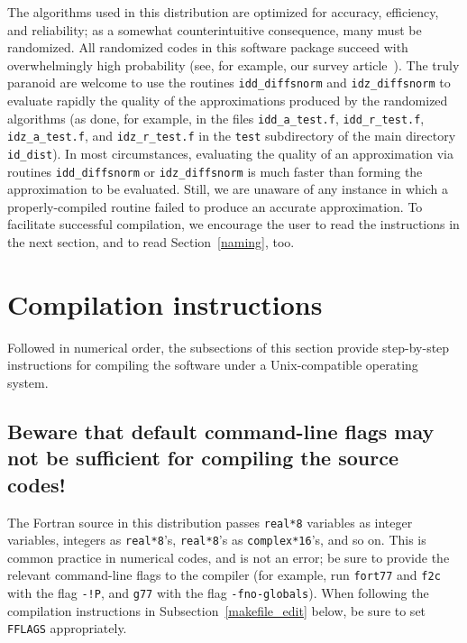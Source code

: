 \documentclass[letterpaper,12pt]{article}
\begin{document}
The algorithms used in this distribution are optimized for accuracy,
efficiency, and reliability; as a somewhat counterintuitive consequence,
many must be randomized. All randomized codes in this software package
succeed with overwhelmingly high probability (see, for example,
our survey article~\cite{liberty-woolfe-martinsson-rokhlin-tygert}).
The truly paranoid are welcome to use the routines {\tt idd\_diffsnorm}
and {\tt idz\_diffsnorm} to evaluate rapidly the quality of the approximations
produced by the randomized algorithms (as done, for example, in the files
{\tt idd\_a\_test.f}, {\tt idd\_r\_test.f}, {\tt idz\_a\_test.f},
and {\tt idz\_r\_test.f} in the {\tt test} subdirectory
of the main directory {\tt id\_dist}).
In most circumstances, evaluating the quality of an approximation via routines
{\tt idd\_diffsnorm} or {\tt idz\_diffsnorm} is much faster than forming
the approximation to be evaluated. Still, we are unaware of any instance
in which a properly-compiled routine failed to produce
an accurate approximation.
To facilitate successful compilation, we encourage the user
to read the instructions in the next section,
and to read Section~\ref{naming}, too.



\section{Compilation instructions}


Followed in numerical order, the subsections of this section
provide step-by-step instructions for compiling the software
under a Unix-compatible operating system.


\subsection{Beware that default command-line flags may not be
            sufficient for compiling the source codes!}
\label{warning}

The Fortran source in this distribution passes {\tt real*8} variables
as integer variables, integers as {\tt real*8}'s,
{\tt real*8}'s as {\tt complex*16}'s, and so on.
This is common practice in numerical codes, and is not an error;
be sure to provide the relevant command-line flags to the compiler
(for example, run {\tt fort77} and {\tt f2c} with the flag {\tt -!P},
and {\tt g77} with the flag {\tt -fno-globals}).
When following the compilation instructions
in Subsection~\ref{makefile_edit} below,
be sure to set {\tt FFLAGS} appropriately.
\end{document}
